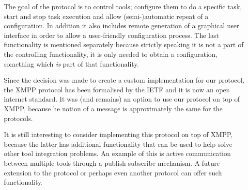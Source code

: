 \documentclass{article}
\begin{document}
   The goal of the protocol is to control tools; configure them to do a
   specific task, start and stop task execution and allow (semi-)automatic
   repeat of a configuration. In addition it also includes remote generation of
   a graphical user interface in order to allow a user-friendly configuration
   process. The last functionality is mentioned separately because strictly
   speaking it is not a part of the controlling functionality, it is only
   needed to obtain a configuration, something which \emph{is} part of that
   functionality.

   Since the decision was made to create a custom implementation for our
   protocol, the XMPP protocol has been formalised by the IETF and it is now an
   open internet standard. It was (and remains) an option to use our protocol
   on top of XMPP, because he notion of a message is approximately the same for
   the protocols.
   
   It is still interesting to consider implementing this protocol on top of
   XMPP, because the latter has additional functionality that can be used to
   help solve other tool integration problems. An example of this is active
   communication between multiple tools through a publish-subscribe mechanism.
   A future extension to the protocol or perhaps even another protocol can
   offer such functionality.

  \enlargethispage*{4pt}
  
\end{document}
